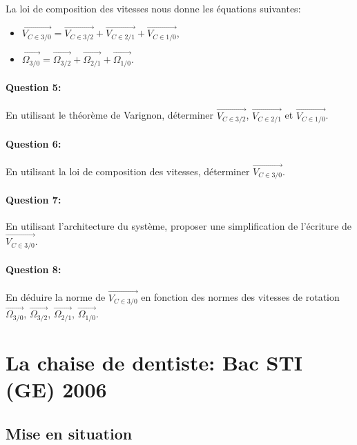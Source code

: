 ~\

La loi de composition des vitesses nous donne les équations suivantes:
\begin{itemize}
 \item $\overrightarrow{V_{C\in 3/0}}=\overrightarrow{V_{C\in 3/2}}+\overrightarrow{V_{C\in 2/1}}+\overrightarrow{V_{C\in 1/0}}$,
 \item $\overrightarrow{\Omega_{3/0}}=\overrightarrow{\Omega_{3/2}}+\overrightarrow{\Omega_{2/1}}+\overrightarrow{\Omega_{1/0}}$.
\end{itemize}

\paragraph{Question 5:} En utilisant le théorème de Varignon, déterminer $\overrightarrow{V_{C\in 3/2}}$, $\overrightarrow{V_{C\in 2/1}}$ et $\overrightarrow{V_{C\in 1/0}}$.

\paragraph{Question 6:} En utilisant la loi de composition des vitesses, déterminer $\overrightarrow{V_{C\in 3/0}}$.

\paragraph{Question 7:} En utilisant l'architecture du système, proposer une simplification de l'écriture de $\overrightarrow{V_{C\in 3/0}}$.

\paragraph{Question 8:} En déduire la norme de $\overrightarrow{V_{C\in 3/0}}$ en fonction des normes des vitesses de rotation $\overrightarrow{\Omega_{3/0}}$, $\overrightarrow{\Omega_{3/2}}$, $\overrightarrow{\Omega_{2/1}}$, $\overrightarrow{\Omega_{1/0}}$.


\section{La chaise de dentiste: Bac STI (GE) 2006}

\subsection{Mise en situation}


